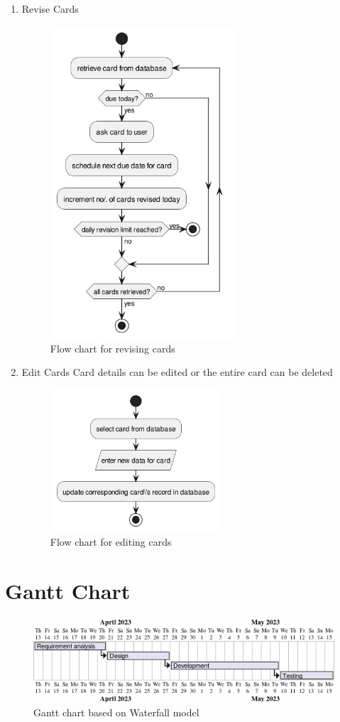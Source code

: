 \documentclass[a4paper]{article}
\begin{document}
\begin{enumerate}
\item Revise Cards
\label{sec:orgd071452}
\begin{figure}[htbp]
\centering
\includegraphics[width=260px]{diagrams/review-cards-flow-chart.png}
\caption{Flow chart for revising cards}
\end{figure}
\FloatBarrier

\item Edit Cards
\label{sec:orgdeaa478}
Card details can be edited or the entire card can be deleted
\begin{figure}[htbp]
\centering
\includegraphics[width=240px]{diagrams/edit-cards-flw-chart.png}
\caption{Flow chart for editing cards}
\end{figure}
\FloatBarrier
\end{enumerate}
\section{Gantt Chart}
\label{sec:orgeea2353}
\begin{figure}[htbp]
\centering
\includegraphics[width=.9\linewidth]{diagrams/gantt-chart.png}
\caption{Gantt chart based on Waterfall model}
\end{figure}
\FloatBarrier
\end{document}
